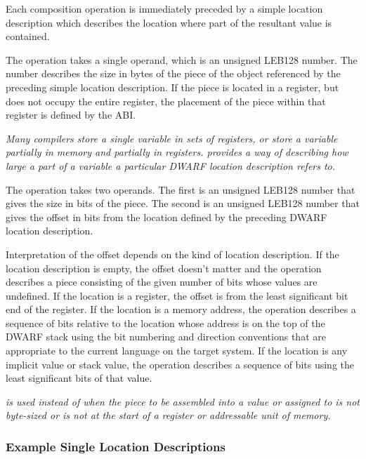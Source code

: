 Each composition operation is immediately preceded by a simple
location description which describes the location where part
of the resultant value is contained.
\begin{enumerate}[1. ]
\itembfnl{\DWOPpieceTARG}
The \DWOPpieceTARG{} operation takes a 
single operand, which is an
unsigned LEB128 number.  The number describes the size in bytes
of the piece of the object referenced by the preceding simple
location description. If the piece is located in a register,
but does not occupy the entire register, the placement of
the piece within that register is defined by the ABI.

\textit{Many compilers store a single variable in sets of registers,
or store a variable partially in memory and partially in
registers. \DWOPpieceINDX{} provides a way of describing how large
a part of a variable a particular DWARF location description
refers to. }

\itembfnl{\DWOPbitpieceTARG}
The \DWOPbitpieceTARG{} 
operation takes two operands. The first
is an unsigned LEB128 number that gives the size in bits
of the piece. The second is an unsigned LEB128 number that
gives the offset in bits from the location defined by the
preceding DWARF location description.  

Interpretation of the
offset depends on the kind of location description. If the
location description is empty, the offset doesn\textquoteright t matter and
the \DWOPbitpieceINDX{} operation describes a piece consisting
of the given number of bits whose values are undefined. If
the location is a register, the offset is from the least
significant bit end of the register. If the location is a
memory address, the \DWOPbitpieceINDX{} operation describes a
sequence of bits relative to the location whose address is
on the top of the DWARF stack using the bit numbering and
direction conventions that are appropriate to the current
language on the target system. If the location is any implicit
value or stack value, the \DWOPbitpieceINDX{} operation describes
a sequence of bits using the least significant bits of that
value.  
\end{enumerate}

\textit{\DWOPbitpieceINDX{} is 
used instead of \DWOPpieceINDX{} when
the piece to be assembled into a value or assigned to is not
byte-sized or is not at the start of a register or addressable
unit of memory.}




\subsubsection{Example Single Location Descriptions}

